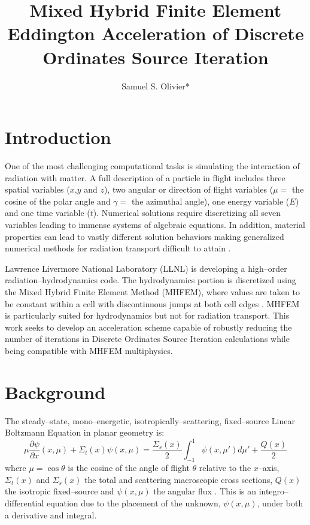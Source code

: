 \documentclass{anstrans}
\title{Mixed Hybrid Finite Element Eddington Acceleration of Discrete Ordinates Source Iteration}
\author{Samuel S. Olivier*}
\institute{Department of Nuclear Engineering, Texas A\&M University, College Station, TX 77843}
\newcommand{\pderiv}[2]{\frac{\partial #1}{\partial #2}}
\begin{document}
\section{Introduction}
	One of the most challenging computational tasks is simulating the interaction of radiation with matter. 
	A full description of a particle in flight includes three spatial variables ($x$,$y$ and $z$), two angular or direction of flight variables ($\mu =$ the cosine of the polar angle and $\gamma =$ the azimuthal angle), one energy variable ($E$) and one time variable ($t$). Numerical solutions require discretizing all seven variables leading to immense systems of algebraic equations. In addition, material properties can lead to vastly different solution behaviors making generalized numerical methods for radiation transport difficult to attain \cite{adams}. 



	Lawrence Livermore National Laboratory (LLNL) is developing a high--order radiation--hydrodynamics code. The hydrodynamics portion is discretized using the Mixed Hybrid Finite Element Method (MHFEM), where values are taken to be constant within a cell with discontinuous jumps at both cell edges \cite{mhfem}. MHFEM is particularly suited for hydrodynamics but not for radiation transport. This work seeks to develop an acceleration scheme capable of robustly reducing the number of iterations in Discrete Ordinates Source Iteration calculations while being compatible with MHFEM multiphysics.   

\section{Background}
	The steady--state, mono--energetic, isotropically--scattering, fixed--source Linear Boltzmann Equation in planar geometry is: 
		\begin{equation} \label{eq:bte}
			\mu \pderiv{\psi}{x}(x, \mu) + \Sigma_t(x) \psi(x,\mu) = 
			\frac{\Sigma_s(x)}{2} \int_{-1}^{1} \psi(x, \mu') d\mu' + \frac{Q(x)}{2}
		\end{equation}
	where $\mu = \cos\theta$ is the cosine of the angle of flight $\theta$ relative to the $x$--axis, $\Sigma_t(x)$ and $\Sigma_s(x)$ the total and scattering macroscopic cross sections, $Q(x)$ the isotropic fixed--source and $\psi(x, \mu)$ the angular flux \cite{adams}. This is an integro--differential equation due to the placement of the unknown, $\psi(x,\mu)$, under both a derivative and integral.
\end{document}
